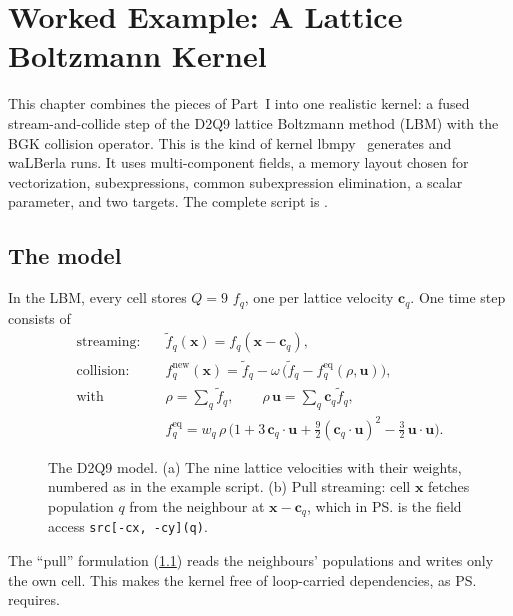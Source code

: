 \chapter{Worked Example: A Lattice Boltzmann Kernel}\label{r01:ch:worked-example}

This chapter combines the pieces of Part~I into one realistic kernel: a fused
stream-and-collide step of the D2Q9 lattice Boltzmann method (LBM) with the BGK
collision operator. This is the kind of kernel lbmpy~\cite{lbmpy} generates and waLBerla
runs. It uses multi-component fields, a memory layout chosen for vectorization,
subexpressions, common subexpression elimination, a scalar parameter, and two targets.
The complete script is .

\section{The model}

In the LBM, every cell stores $Q=9$  $f_q$, one per lattice velocity
$\mathbf c_q$. One time step consists of
\begin{align*}
  \text{streaming:}\quad & \tilde f_q(\mathbf x) = f_q(\mathbf x - \mathbf c_q),\\
  \text{collision:}\quad & f_q^{\text{new}}(\mathbf x) = \tilde f_q - \omega\,\bigl(\tilde f_q - f_q^{\text{eq}}(\rho, \mathbf u)\bigr),\\
  \text{with}\quad & \rho = \sum_q \tilde f_q,\qquad \rho\,\mathbf u = \sum_q \mathbf c_q \tilde f_q,\\
  & f_q^{\text{eq}} = w_q\,\rho\,\bigl(1 + 3\,\mathbf c_q\!\cdot\!\mathbf u + \tfrac92 (\mathbf c_q\!\cdot\!\mathbf u)^2 - \tfrac32\,\mathbf u\!\cdot\!\mathbf u\bigr).
\end{align*}

\begin{figure}[htbp]
  \centering
  
  \caption[The D2Q9 model and pull streaming]{The D2Q9 model. (a) The nine lattice velocities with their weights, numbered as in the example script. (b) Pull streaming: cell $\mathbf x$ fetches population $q$ from the neighbour at $\mathbf x-\mathbf c_q$, which in \ps{} is the field access \texttt{src[-cx, -cy](q)}.}
  \label{r01:fig:d2q9}
\end{figure}

The ``pull'' formulation (\cref{r01:fig:d2q9}) reads the neighbours' populations and writes
only the own cell.
This makes the kernel free of loop-carried dependencies, as \ps{} requires.

